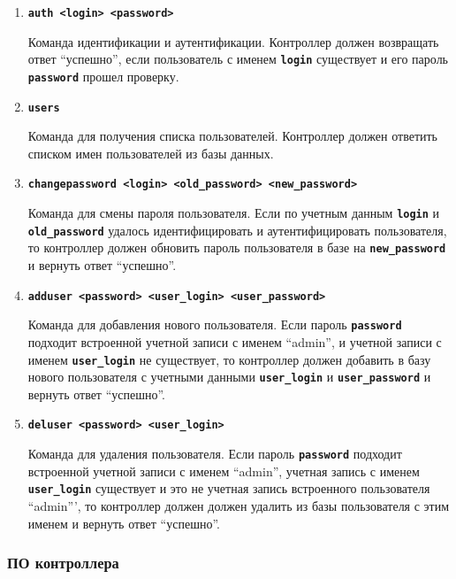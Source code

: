 \documentclass[14pt]{extarticle}
\begin{document}
\begin{enumerate}

 \item \texttt{\textbf{auth <login> <password>}}

 Команда идентификации и аутентификации.
 Контроллер должен возвращать ответ ``успешно'', если пользователь с именем
 \texttt{\textbf{login}} существует и его пароль \texttt{\textbf{password}} прошел
 проверку.

 \item \texttt{\textbf{users}}

 Команда для получения списка пользователей.
 Контроллер должен ответить списком имен пользователей из базы данных.

 \item \texttt{\textbf{changepassword <login> <old\_password> <new\_password>}}

 Команда для смены пароля пользователя.
 Если по учетным данным \texttt{\textbf{login}} и \texttt{\textbf{old\_password}}
 удалось идентифицировать и аутентифицировать пользователя, то контроллер должен
 обновить пароль пользователя в базе на \texttt{\textbf{new\_password}} и вернуть
 ответ ``успешно''.

 \item \texttt{\textbf{adduser <password> <user\_login> <user\_password>}}

 Команда для добавления нового пользователя.
 Если пароль \texttt{\textbf{password}} подходит встроенной учетной записи
 с именем ``admin'', и учетной записи с именем \texttt{\textbf{user\_login}}
 не существует, то контроллер должен добавить в базу нового пользователя
 с учетными данными \texttt{\textbf{user\_login}} и \texttt{\textbf{user\_password}} 
 и вернуть ответ ``успешно''.

 \item \texttt{\textbf{deluser <password> <user\_login>}}

 Команда для удаления пользователя.
 Если пароль \texttt{\textbf{password}} подходит встроенной учетной записи
 с именем ``admin'', учетная запись с именем \texttt{\textbf{user\_login}}
 существует и это не учетная запись встроенного пользователя ``admin''',
 то контроллер должен должен удалить из базы пользователя с этим именем
 и вернуть ответ ``успешно''.
 
\end{enumerate}

\subsubsection{ПО контроллера}
\end{document}
